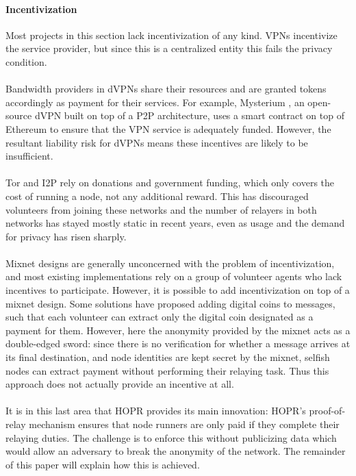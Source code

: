 \paragraph{Incentivization} Most projects in this section lack incentivization of any kind. VPNs incentivize the service provider, but since this is a centralized entity this fails the privacy condition. 
\\~\\Bandwidth providers in dVPNs share their resources and are granted tokens accordingly as payment for their
services. For example, Mysterium \cite{mysterium}, an open-source dVPN built on top of a P2P architecture, uses a smart contract on top of Ethereum to ensure
that the VPN service is adequately funded. However, the resultant liability risk for dVPNs means these incentives are likely to be insufficient. 
\\~\\Tor and I2P rely on donations and government funding, which only covers the cost of running a node, not any additional reward. This has discouraged volunteers from joining these networks and the number of relayers in both networks has stayed mostly static in recent years, even as usage and the demand for privacy has risen sharply.
\\~\\Mixnet designs are generally unconcerned with the problem of incentivization, and most existing implementations rely on a group of volunteer agents who lack incentives to participate. However, it is possible to add incentivization on top of a mixnet design. Some solutions have proposed adding digital coins to messages, such
that each volunteer can extract only the digital coin designated as a payment for them. However, here the anonymity provided by the mixnet acts as a double-edged sword: since there is no verification for whether a message arrives at its final destination, and node identities are kept secret by the mixnet, selfish nodes can extract payment without performing their relaying task. Thus this approach does not actually provide an incentive at all.
\\~\\It is in this last area that HOPR provides its main innovation: HOPR's proof-of-relay mechanism ensures that node runners are only paid if they complete their relaying duties. The challenge is to enforce this without publicizing data which would allow an adversary to break the anonymity of the network. The remainder of this paper will explain how this is achieved. 
